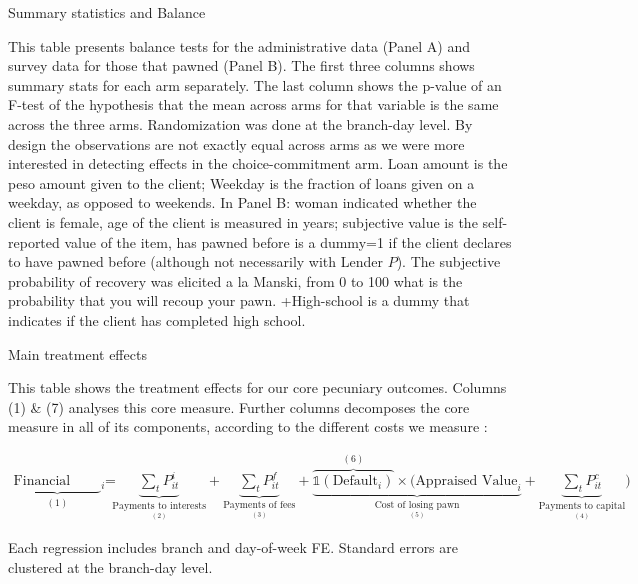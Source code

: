 \documentclass[oneside,11pt]{article}
\begin{document}
\begin{table}[H]
\caption{Summary statistics and Balance}
\label{SS}
\begin{center}
\scriptsize{}
\end{center}

\end{table}
\vspace{-.3in}
\scriptsize {
\noindent This table presents balance tests for the administrative data (Panel A) and survey data for those that pawned (Panel B). The first three columns shows summary stats for each arm separately. The last column shows the p-value of an F-test of the hypothesis that the mean across arms for that variable is the same across the three arms. Randomization was done at the branch-day level. By design the observations are not exactly equal across arms as we were more interested in detecting effects in the choice-commitment arm. Loan amount is the peso amount given to the client; Weekday is the fraction of loans given on a weekday, as opposed to weekends.  In Panel B: woman indicated whether the client is female, age of the client is measured in years; subjective value is the self-reported value of the item, has pawned before is a dummy=1 if the client declares to have pawned before (although not necessarily with Lender $P$). The subjective probability of recovery was elicited a la Manski, from 0 to 100 what is the probability that you will recoup your pawn. +High-school is a dummy that indicates if the client has completed high school. 
}



\newpage

\vspace{.2in}

\begin{table}[H]
\caption{Main treatment effects}
\label{main_impact_table}
\begin{center}
\scriptsize{}
\end{center}
\scriptsize This table shows the treatment effects for our core pecuniary outcomes. Columns (1) \& (7) analyses this core measure. Further columns decomposes the core measure in all of its components, according to the different costs we measure :

\begin{align*}
    \underbrace{\text{Financial Cost}_i}_{(1)} =&  \underbrace{\sum_t P^i_{it}}_{\underset{(2)}{\text{Payments to interests}}}  +\underbrace{\sum_t P^f_{it}}_{\underset{(3)}{\text{Payments of fees}}} + \underbrace{\overbrace{\mathds{1}(\text{Default}_i)}^{(6)}\times (\text{Appraised Value}_i}_{\underset{(5)}{\text{Cost of losing pawn}}} + \underbrace{\sum_t P^c_{it}}_{\underset{(4)}{\text{Payments to capital}}})
\end{align*}

Each regression includes branch and day-of-week FE. Standard errors are clustered at the branch-day level. 

\end{table}
\end{document}
